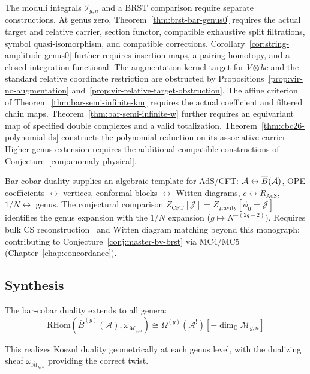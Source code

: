 \begin{remark}[Scope]
The moduli integrals $\mathcal I_{g,n}$ and a BRST comparison require separate constructions.
At genus zero, Theorem~\ref{thm:brst-bar-genus0} requires the actual target and relative carrier, section functor, compatible exhaustive split filtrations, symbol quasi-isomorphism, and compatible corrections.
Corollary~\ref{cor:string-amplitude-genus0} further requires insertion maps, a pairing homotopy, and a closed integration functional.
The augmentation-kernel target for $V\otimes bc$ and the standard relative coordinate restriction are obstructed by Propositions~\ref{prop:vir-no-augmentation} and~\ref{prop:vir-relative-target-obstruction}.
The affine criterion of Theorem~\ref{thm:bar-semi-infinite-km} requires the actual coefficient and filtered chain maps.
Theorem~\ref{thm:bar-semi-infinite-w} further requires an equivariant map of specified double complexes and a valid totalization.
Theorem~\ref{thm:cbc26-polynomial-ds} constructs the polynomial reduction on its associative carrier.
Higher-genus extension requires the additional compatible constructions of Conjecture~\ref{conj:anomaly-physical}.
\end{remark}


\begin{conjecture}
\label{conj:holographic-bar-cobar}
Bar-cobar duality supplies an algebraic template for AdS/CFT: $\mathcal{A} \leftrightarrow \overline{B}(\mathcal{A})$, OPE coefficients $\leftrightarrow$ vertices, conformal blocks $\leftrightarrow$ Witten diagrams, $c \leftrightarrow R_{\mathrm{AdS}}$, $1/N \leftrightarrow$ genus.  The conjectural comparison $Z_{\mathrm{CFT}}[\mathcal{J}] = Z_{\mathrm{gravity}}[\phi_0 = \mathcal{J}]$ identifies the genus expansion with the $1/N$ expansion ($g \mapsto N^{-(2g-2)}$).  Requires bulk CS reconstruction~\cite{Wit89} and Witten diagram matching beyond this monograph; contributing to Conjecture~\ref{conj:master-bv-brst} via MC4/MC5 (Chapter~\ref{chap:concordance}).
\end{conjecture}


\subsection{Synthesis}\label{subsec:synthesis}

\begin{theorem}\label{thm:poincare-extended}
The bar-cobar duality extends to all genera:
\[\mathrm{RHom}(\bar{B}^{(g)}(\mathcal{A}), \omega_{\overline{\mathcal{M}}_{g,n}}) \cong \Omega^{(g)}(\mathcal{A}^!)[-\dim_{\mathbb{C}} \mathcal{M}_{g,n}]\]

This realizes Koszul duality geometrically at each genus level, with the
dualizing sheaf $\omega_{\overline{\mathcal{M}}_{g,n}}$ providing the
correct twist.
\end{theorem}

